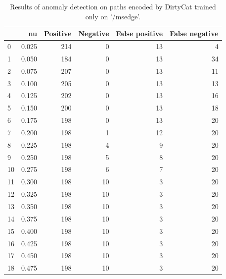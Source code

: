 \documentclass[a4paper,twoside,12pt]{book}
\begin{document}
\begin{appendices}
\begin{table}
	\centering
	\caption{Results of anomaly detection on paths encoded by DirtyCat trained only on '/msedge'.}
	\label{id:tab:ocsvmOnDirtyCatMsEdge}
	\begin{tabular}{lrrrrr}
		\toprule
		{} &     nu &  Positive &  Negative &  False positive &  False negative \\
		\midrule
		0  &  0.025 &       214 &         0 &              13 &               4 \\
		1  &  0.050 &       184 &         0 &              13 &              34 \\
		2  &  0.075 &       207 &         0 &              13 &              11 \\
		3  &  0.100 &       205 &         0 &              13 &              13 \\
		4  &  0.125 &       202 &         0 &              13 &              16 \\
		5  &  0.150 &       200 &         0 &              13 &              18 \\
		6  &  0.175 &       198 &         0 &              13 &              20 \\
		7  &  0.200 &       198 &         1 &              12 &              20 \\
		8  &  0.225 &       198 &         4 &               9 &              20 \\
		9  &  0.250 &       198 &         5 &               8 &              20 \\
		10 &  0.275 &       198 &         6 &               7 &              20 \\
		11 &  0.300 &       198 &        10 &               3 &              20 \\
		12 &  0.325 &       198 &        10 &               3 &              20 \\
		13 &  0.350 &       198 &        10 &               3 &              20 \\
		14 &  0.375 &       198 &        10 &               3 &              20 \\
		15 &  0.400 &       198 &        10 &               3 &              20 \\
		16 &  0.425 &       198 &        10 &               3 &              20 \\
		17 &  0.450 &       198 &        10 &               3 &              20 \\
		18 &  0.475 &       198 &        10 &               3 &              20 \\

\end{tabular}
\end{table}
\end{appendices}
\end{document}
